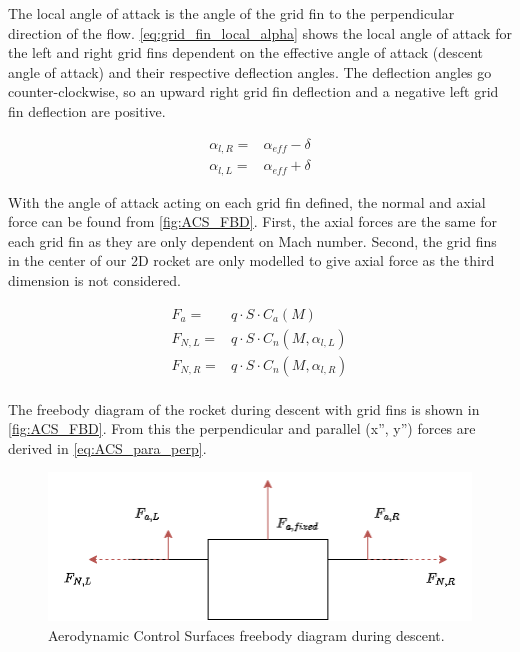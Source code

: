 The local angle of attack is the angle of the grid fin to the perpendicular direction of the flow. \autoref{eq:grid_fin_local_alpha} shows the local angle of attack for the left and right grid fins dependent on the effective angle of attack (descent angle of attack) and their respective deflection angles. The deflection angles go counter-clockwise, so an upward right grid fin deflection and a negative left grid fin deflection are positive.

\begin{equation}
\begin{aligned}
    \alpha_{l,R} =& \alpha_{eff} - \delta \\
    \alpha_{l,L} =& \alpha_{eff} + \delta 
\end{aligned}
\label{eq:grid_fin_local_alpha}
\end{equation}

With the angle of attack acting on each grid fin defined, the normal and axial force can be found from \autoref{fig:ACS_FBD}. First, the axial forces are the same for each grid fin as they are only dependent on Mach number. Second, the grid fins in the center of our 2D rocket are only modelled to give axial force as the third dimension is not considered.

\begin{equation}
\begin{aligned}
    F_a =& q \cdot S \cdot C_a(M) \\
    F_{N,L} =& q \cdot S \cdot C_n(M,\alpha_{l,L}) \\
    F_{N,R} =& q \cdot S \cdot C_n(M,\alpha_{l,R}) \\
\end{aligned}
\label{eq:grid_fin_aero_forces}
\end{equation}

The freebody diagram of the rocket during descent with grid fins is shown in \autoref{fig:ACS_FBD}. From this the perpendicular and parallel (x'', y'') forces are derived in \autoref{eq:ACS_para_perp}.

\begin{figure}[H]
    \centering
    \includegraphics[width=0.5\linewidth]{figures/LiteratureStudy/GridFins/ACS_simple.png}
    \caption{Aerodynamic Control Surfaces freebody diagram during descent.}
    \label{fig:ACS_FBD}
\end{figure}

